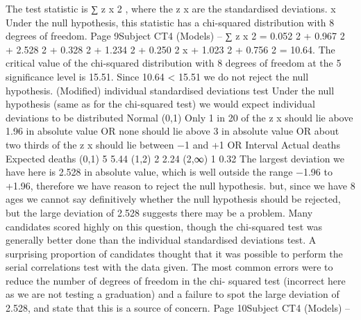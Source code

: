 The test statistic is
∑ z x 2 , where the z x are the standardised deviations.
x
Under the null hypothesis, this statistic has a chi-squared distribution with 8 degrees
of freedom.
Page 9Subject CT4 (Models) – %
∑ z x 2
= 0.052 2 + 0.967 2 + 2.528 2 + 0.328 2 + 1.234 2 + 0.250 2
x
+ 1.023 2 + 0.756 2 = 10.64.
The critical value of the chi-squared distribution with 8 degrees of freedom at the 5%
significance level is 15.51.
Since 10.64 < 15.51
we do not reject the null hypothesis.
(Modified) individual standardised deviations test
Under the null hypothesis (same as for the chi-squared test)
we would expect individual deviations to be distributed Normal (0,1)
Only 1 in 20 of the z x should lie above 1.96 in absolute value
OR
none should lie above 3 in absolute value
OR
about two thirds of the z x should lie between −1 and +1
OR
Interval
Actual deaths
Expected deaths
(0,1)
5
5.44
(1,2)
2
2.24
(2,∞)
1
0.32
The largest deviation we have here is 2.528 in absolute value,
which is well outside the range −1.96 to +1.96,
therefore we have reason to reject the null hypothesis.
but, since we have 8 ages we cannot say definitively whether the null hypothesis
should be rejected, but the large deviation of 2.528 suggests there may be a problem.
Many candidates scored highly on this question, though the chi-squared test was generally
better done than the individual standardised deviations test. A surprising proportion of
candidates thought that it was possible to perform the serial correlations test with the data
given. The most common errors were to reduce the number of degrees of freedom in the chi-
squared test (incorrect here as we are not testing a graduation) and a failure to spot the
large deviation of 2.528, and state that this is a source of concern.
Page 10Subject CT4 (Models) – %
